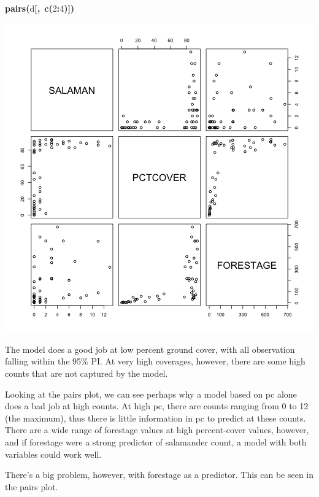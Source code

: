 \documentclass{article}
\makeatletter
\newcommand{\hlnumber}[1]{\textcolor[rgb]{0,0,0}{#1}}%
\newcommand{\hlfunctioncall}[1]{\textcolor[rgb]{.5,0,.33}{\textbf{#1}}}%
\newcommand{\hlkeyword}[1]{\textbf{#1}}%
\newcommand{\hlsymbol}[1]{#1}%
\newcommand{\hlstd}[1]{\textcolor[rgb]{0,0,0}{#1}}%
\newenvironment{kframe}{%
 \def\FrameCommand##1{\hskip\@totalleftmargin \hskip-\fboxsep
 \colorbox{shadecolor}{##1}\hskip-\fboxsep
     \hskip-\linewidth \hskip-\@totalleftmargin \hskip\columnwidth}%
 \MakeFramed {\advance\hsize-\width
   \@totalleftmargin\z@ \linewidth\hsize
   \@setminipage}}%
 {\par\unskip\endMakeFramed}
\newenvironment{knitrout}{}{} %
\makeatother
\begin{document}
\begin{knitrout}
{\begin{kframe}
\begin{flushleft}
\ttfamily\noindent
\hspace*{\fill}\\
\hlstd{}\hlfunctioncall{pairs}\hlkeyword{(}\hlsymbol{d}\hlkeyword{[}\hlkeyword{,}{\ }\hlfunctioncall{c}\hlkeyword{(}\hlnumber{2}\hlkeyword{:}\hlnumber{4}\hlkeyword{)}\hlkeyword{]}\hlkeyword{)}\mbox{}
\normalfont
\end{flushleft}
\includegraphics{sal-fig2} \end{kframe}}
\end{knitrout}


The model does a good job at low percent ground cover, with all observation falling within the 95\% PI. 
At very high coverages, however, there are some high counts that are not captured by the model.

Looking at the pairs plot, we can see perhaps why a model based on pc alone does a bad job at high counts. 
At high pc, there are counts ranging from 0 to 12 (the maximum), thus there is little information in pc to predict  at these counts. 
There are a wide range of forestage values at high percent-cover values, however, and if forestage were a strong predictor of salamander count, a model with both variables could work well. 

There's a big problem, however, with forestage as a predictor. This can be seen in the pairs plot.
\end{document}
